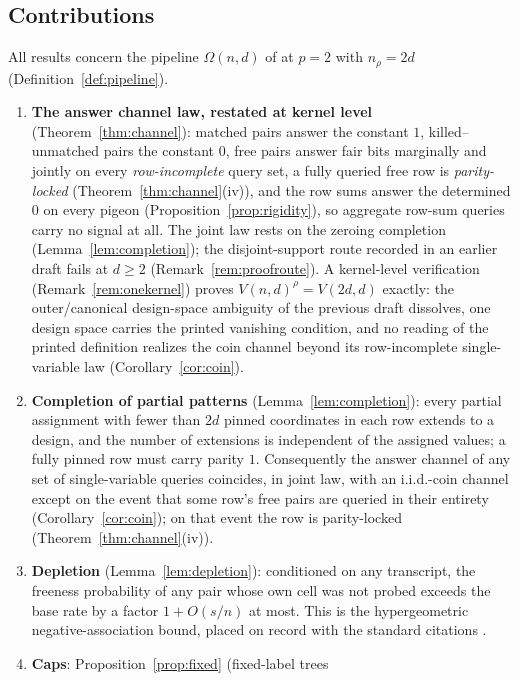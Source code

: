 \documentclass[11pt]{article}
\theoremstyle{definition}
\theoremstyle{remark}
\begin{document}
\subsection{Contributions}

All results concern the pipeline $\Omega(n,d)$ of \cite{Kra26} at $p=2$
with $n_\rho=2d$ (Definition~\ref{def:pipeline}).

\begin{enumerate}
\item \textbf{The answer channel law, restated at kernel level}
(Theorem~\ref{thm:channel}): matched pairs answer the constant $1$,
killed--unmatched pairs the constant $0$, free pairs answer fair bits
marginally and jointly on every \emph{row-incomplete} query set, a
fully queried free row is \emph{parity-locked} (Theorem~\ref{thm:channel}(iv)),
and the row sums answer the determined $0$ on every pigeon
(Proposition~\ref{prop:rigidity}), so aggregate row-sum queries carry
no signal at all.  The joint law rests on the zeroing completion
(Lemma~\ref{lem:completion}); the disjoint-support route recorded in an
earlier draft fails at $d\ge2$ (Remark~\ref{rem:proofroute}).  A
kernel-level verification (Remark~\ref{rem:onekernel}) proves
$V(n,d)^{\rho}=V(2d,d)$ exactly: the outer/canonical design-space
ambiguity of the previous draft dissolves, one design space carries the
printed vanishing condition, and no reading of the printed definition
realizes the coin channel beyond its row-incomplete single-variable law
(Corollary~\ref{cor:coin}).
\item \textbf{Completion of partial patterns}
(Lemma~\ref{lem:completion}): every partial assignment with fewer than
$2d$ pinned coordinates in each row extends to a design, and the number of
extensions is independent of the assigned values; a fully pinned row must
carry parity $1$.  Consequently the answer channel of any set of
single-variable queries coincides, in joint law, with an i.i.d.-coin
channel except on the event that some row's free pairs are queried in
their entirety (Corollary~\ref{cor:coin}); on that event the row is
parity-locked (Theorem~\ref{thm:channel}(iv)).
\item \textbf{Depletion}
(Lemma~\ref{lem:depletion}): conditioned on any transcript, the freeness
probability of any pair whose own cell was not probed exceeds the base
rate by a factor $1+O(s/n)$ at most.  This is the hypergeometric
negative-association bound, placed on record with the standard citations
\cite{JoagDevProschan83,DubhashiRanjan98}.
\item \textbf{Caps}: Proposition~\ref{prop:fixed} (fixed-label trees

\end{enumerate}
\end{document}
